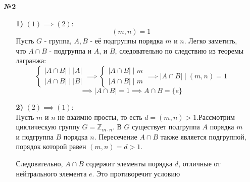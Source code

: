 \documentclass[a4paper]{article}
\newcommand{\case}[1]{\begin{cases} #1 \end{cases}}
\newcommand{\divides}{\;|\;}
\begin{document}
\begin{enumerate}
    \item[\textbf{№2}]\begin{enumerate}
        \item[\textbf{1)}] $(1) \implies (2):$\\
        $$(m, n) = 1$$
        Пусть $G$ - группа, $A, B$ - её подгруппы порядка $m$ и $n$. Легко заметить, что $A \cap B$ - подгруппа и $A$, и $B$, следовательно по следствию из теоремы лагранжа:
        $$\case{|A\cap B| \divides |A|\\
        |A\cap B| \divides |B|} \implies \case{|A\cap B| \divides m\\
        |A\cap B| \divides m} \implies |A\cap B| \divides (m, n) = 1 $$
        $$\implies |A\cap B| = 1 \implies A \cap B = \{e\}$$

        \item[\textbf{2)}] $(2) \implies (1):$\\
        Пусть \( m \) и \( n \) не взаимно просты, то есть  \( d = (m, n) > 1 \).Рассмотрим циклическую группу \( G = \mathbb{Z}_{m \cdot n} \). В \( G \) существует подгруппа \( A \) порядка \( m \) и подгруппа \( B \) порядка \( n \). Пересечение \( A \cap B \) также является подгруппой, порядок которой равен \( (m, n) = d > 1 \).
        
        Следовательно, \( A \cap B \) содержит элементы порядка \( d \), отличные от нейтрального элемента \( e \). Это противоречит условию

    \end{enumerate}

\end{enumerate}
\end{document}
